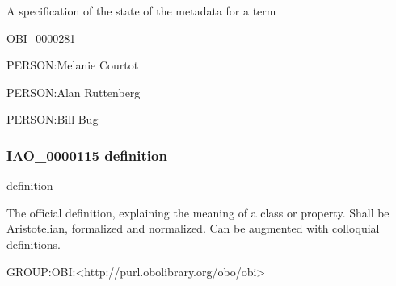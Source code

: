 \documentclass[letterpaper,10pt,english]{sphinxmanual}
\begin{document}
\begin{sphinxShadowBox}

\sphinxAtStartPar
A specification of the state of the metadata for a term
\end{sphinxShadowBox}

\begin{sphinxShadowBox}

\sphinxAtStartPar
OBI\_0000281
\end{sphinxShadowBox}

\begin{sphinxShadowBox}

\sphinxAtStartPar
PERSON:Melanie Courtot

\sphinxAtStartPar
PERSON:Alan Ruttenberg

\sphinxAtStartPar
PERSON:Bill Bug
\end{sphinxShadowBox}
\begin{quote}

\ignorespaces \end{quote}


\subsubsection{IAO\_0000115 \sphinxhyphen{} definition}
\label{\detokenize{doc-IAO_0000115:iao-0000115-definition}}\label{\detokenize{doc-IAO_0000115:index-0}}\label{\detokenize{doc-IAO_0000115::doc}}
\begin{sphinxShadowBox}

\sphinxAtStartPar
definition
\end{sphinxShadowBox}

\begin{sphinxShadowBox}

\sphinxAtStartPar
The official definition, explaining the meaning of a class or property. Shall be Aristotelian, formalized and normalized. Can be augmented with colloquial definitions.
\end{sphinxShadowBox}

\begin{sphinxShadowBox}

\sphinxAtStartPar
GROUP:OBI:\textless{}http://purl.obolibrary.org/obo/obi\textgreater{}
\end{sphinxShadowBox}
\end{document}
